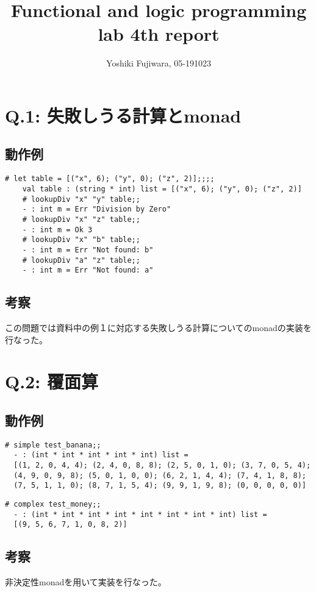 \documentclass[uplatex,12pt]{jsarticle}
\title {Functional and logic programming lab 4th report}
\date{}
\begin{document}
\author{Yoshiki Fujiwara, 05-191023}
\maketitle
\section{Q.1: 失敗しうる計算とmonad}
\subsection{動作例}
  \begin{lstlisting}[caption=動作例]
    # let table = [("x", 6); ("y", 0); ("z", 2)];;;;
    val table : (string * int) list = [("x", 6); ("y", 0); ("z", 2)]
    # lookupDiv "x" "y" table;;
    - : int m = Err "Division by Zero"
    # lookupDiv "x" "z" table;;
    - : int m = Ok 3
    # lookupDiv "x" "b" table;;
    - : int m = Err "Not found: b"
    # lookupDiv "a" "z" table;;
    - : int m = Err "Not found: a"
  \end{lstlisting}

\subsection{考察}
この問題では資料中の例１に対応する失敗しうる計算についてのmonadの実装を行なった。

\section{Q.2: 覆面算}
\subsection{動作例}
  \begin{lstlisting}[caption=動作例]
  # simple test_banana;;
  - : (int * int * int * int * int) list =
  [(1, 2, 0, 4, 4); (2, 4, 0, 8, 8); (2, 5, 0, 1, 0); (3, 7, 0, 5, 4);
  (4, 9, 0, 9, 8); (5, 0, 1, 0, 0); (6, 2, 1, 4, 4); (7, 4, 1, 8, 8);
  (7, 5, 1, 1, 0); (8, 7, 1, 5, 4); (9, 9, 1, 9, 8); (0, 0, 0, 0, 0)]
  \end{lstlisting}

  \begin{lstlisting}[caption=動作例]
  # complex test_money;;
  - : (int * int * int * int * int * int * int * int) list =
  [(9, 5, 6, 7, 1, 0, 8, 2)]
  \end{lstlisting}

\subsection{考察}
非決定性monadを用いて実装を行なった。
\end{document}
